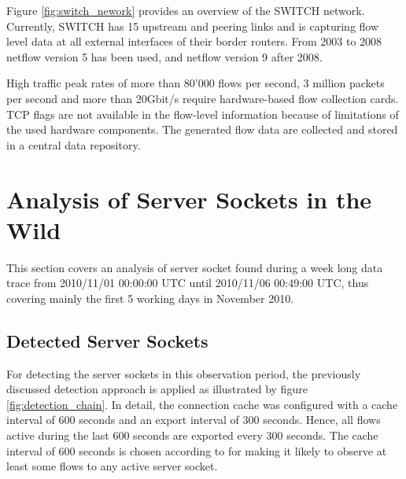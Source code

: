 Figure \ref{fig:switch_nework} provides an overview of the SWITCH network. 
Currently, SWITCH has 15 upstream and peering links and is capturing flow level data at all external interfaces of their border routers. From 2003 to 2008 \gls{netflow} version 5 has been used, and \gls{netflow} version 9 after 2008\citep{Schatzmann:Tracing}.

High traffic peak rates of more than 80'000 flows per second, 3 million packets per second and more than 20Gbit/s require hardware-based flow collection cards\citep{Schatzmann:Tracing}. 
\gls{TCP} flags are not available in the flow-level information because of limitations of the used hardware components\citep{Schatzmann:Tracing}. 
The generated flow data are collected and stored in a central data repository.

\section{Analysis of Server Sockets in the Wild\label{section:analysis_in_wild}}

This section covers an analysis of \gls{server socket} found during a week long data trace from 2010/11/01 00:00:00 UTC until 2010/11/06 00:49:00 UTC, thus covering mainly the first 5 working days in November 2010.

\subsection{Detected Server Sockets}

For detecting the \glspl{server socket} in this observation period, the previously discussed detection approach is applied as illustrated by figure \ref{fig:detection_chain}. 
In detail, the connection cache was configured with a cache interval of 600 seconds and an export interval of 300 seconds. Hence, all flows active during the last 600 seconds are exported every 300 seconds. The cache interval of 600 seconds is chosen according to \citet{Schatzmann:Tracing} for making it likely to observe at least some flows to any active server socket. 

